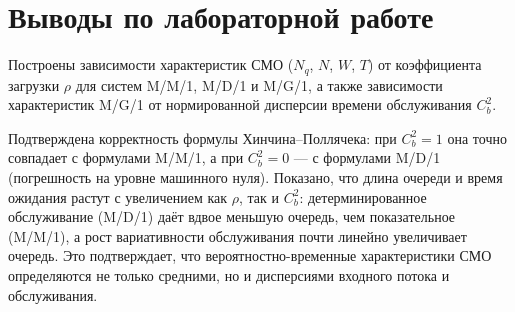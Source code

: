 \documentclass[a4paper,14pt,oneside,openany]{memoir}
\begin{document}
\section*{Выводы по лабораторной работе}
Построены зависимости характеристик СМО ($N_q$, $N$, $W$, $T$) от коэффициента загрузки $\rho$ для систем M/M/1, M/D/1 и M/G/1, а также зависимости характеристик M/G/1 от нормированной дисперсии времени обслуживания $C_b^2$.

Подтверждена корректность формулы Хинчина--Поллячека: при $C_b^2=1$ она точно совпадает с формулами M/M/1, а при $C_b^2=0$ --- с формулами M/D/1 (погрешность на уровне машинного нуля). Показано, что длина очереди и время ожидания растут с увеличением как $\rho$, так и $C_b^2$: детерминированное обслуживание (M/D/1) даёт вдвое меньшую очередь, чем показательное (M/M/1), а рост вариативности обслуживания почти линейно увеличивает очередь. Это подтверждает, что вероятностно-временные характеристики СМО определяются не только средними, но и дисперсиями входного потока и обслуживания.
\end{document}
